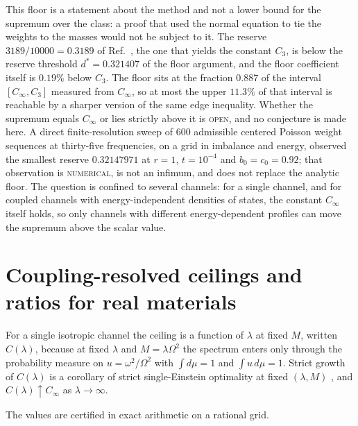 \documentclass[aps,10pt,superscriptaddress,floatfix,amsmath,amssymb,nofootinbib]{revtex4-2}
\newcommand{\Cinf}{C_\infty}
\newcommand{\Cthree}{C_{3}}
\newcommand{\NUM}{\textsc{numerical}}
\newcommand{\OPEN}{\textsc{open}}
\begin{document}
This floor is a statement about the method and not a lower bound for the supremum over the
class: a proof that used the normal equation to tie the weights to the masses would not be
subject to it. The reserve $3189/10000=0.3189$ of Ref.~\cite{anisosharp}, the one that
yields the constant $\Cthree$, is below the reserve threshold $d^{*}=0.321407$ of the
floor argument, and the floor coefficient itself is $0.19\%$ below $\Cthree$. The floor sits at the fraction $0.887$ of the
interval $[\Cinf,\Cthree]$ measured from $\Cinf$, so at most the upper $11.3\%$ of that
interval is reachable by a sharper version of the same edge inequality. Whether the supremum equals
$\Cinf$ or lies strictly above it is \OPEN{}, and no conjecture is made here. A direct
finite-resolution sweep of $600$ admissible centered Poisson weight sequences at thirty-five
frequencies, on a grid in imbalance and energy, observed the smallest reserve $0.32147971$
at $r=1$, $t=10^{-4}$ and $b_0=c_0=0.92$; that observation is \NUM{}, is not an infimum, and
does not replace the analytic floor. The question is confined to several channels: for a
single channel, and for coupled channels with energy-independent densities of states, the
constant $\Cinf$ itself holds, so only channels with different energy-dependent profiles can
move the supremum above the scalar value.

\section{Coupling-resolved ceilings and ratios for real materials}\label{sec:material}

For a single isotropic channel the ceiling is a function of $\lambda$ at fixed $M$, written
$C(\lambda)$, because at fixed $\lambda$ and $M=\lambda\Omega^{2}$ the spectrum enters only
through the probability measure on $u=\omega^{2}/\Omega^{2}$ with $\int d\mu=1$ and
$\int u\,d\mu=1$. Strict growth of $C(\lambda)$ is a corollary of strict single-Einstein
optimality at fixed $(\lambda,M)$ \cite{rens}, and $C(\lambda)\uparrow\Cinf$ as
$\lambda\to\infty$.

The values are certified in exact arithmetic on a rational grid.
\end{document}

